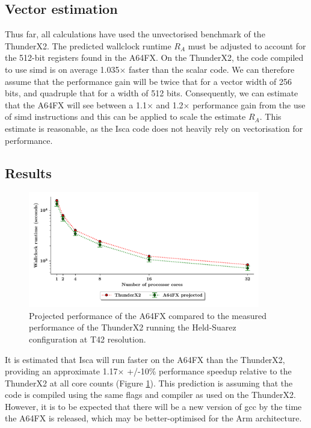 \documentclass[a4paper,11pt]{report}
\begin{document}
\subsection{Vector estimation}
Thus far, all calculations have used the unvectorised benchmark of the ThunderX2. The predicted wallclock runtime $R_{A}$ must be adjusted to account for the 512-bit registers found in the A64FX. On the ThunderX2, the code compiled to use \gls{simd} is on average 1.035$\times$ faster than the scalar code. We can therefore assume that the performance gain will be twice that for a vector width of 256 bits, and quadruple that for a width of 512 bits. Consequently, we can estimate that the A64FX will see between a 1.1$\times$ and 1.2$\times$ performance gain from the use of \gls{simd} instructions and this can be applied to scale the estimate $R_{A}$. This estimate is reasonable, as the Isca code does not heavily rely on vectorisation for performance. 
\subsection{Results}
\begin{figure}[H]
\begin{center}
\includegraphics[width=0.9\textwidth]{img/a64fx-projection.pdf}
\caption[Projected performance of the A64FX]{Projected performance of the A64FX compared to the measured performance of the ThunderX2 running the Held-Suarez configuration at T42 resolution. }
\label{fig:projection}
\end{center}
\end{figure}


It is estimated that Isca will run faster on the A64FX than the ThunderX2, providing an approximate 1.17$\times$ +/-10\% performance speedup relative to the ThunderX2 at all core counts (Figure \ref{fig:projection}). This prediction is assuming that the code is compiled using the same flags and compiler as used on the ThunderX2. However, it is to be expected that there will be a new version of \gls{gcc} by the time the A64FX is released, which may be better-optimised for the Arm architecture.
\end{document}
